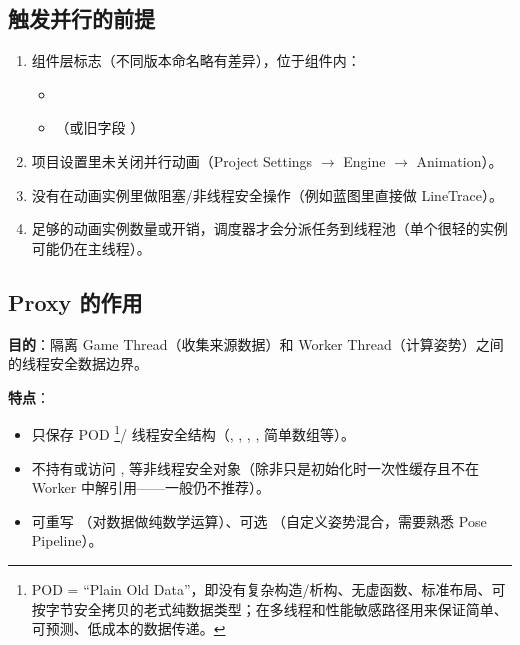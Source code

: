 \documentclass[10pt,openright,oneside,CJKmath]{MyBook}
\begin{document}
\subsection{触发并行的前提}
\begin{enumerate}
  \item 组件层标志（不同版本命名略有差异），位于组件内：
  \begin{itemize}
    \item {}
    \item {}（或旧字段 ）
  \end{itemize}
  \item 项目设置里未关闭并行动画（Project Settings $\rightarrow$ Engine $\rightarrow$ Animation）。
  \item 没有在动画实例里做阻塞/非线程安全操作（例如蓝图里直接做 LineTrace）。
  \item 足够的动画实例数量或开销，调度器才会分派任务到线程池（单个很轻的实例可能仍在主线程）。
\end{enumerate}

\subsection{Proxy 的作用}
\textbf{目的}：隔离 Game Thread（收集来源数据）和 Worker Thread（计算姿势）之间的线程安全数据边界。  

\textbf{特点}：
\begin{itemize}
  \item 只保存 POD \footnote{POD = “Plain Old Data”，即没有复杂构造/析构、无虚函数、标准布局、可按字节安全拷贝的老式纯数据类型；在多线程和性能敏感路径用来保证简单、可预测、低成本的数据传递。}/ 线程安全结构（, , , , 简单数组等）。
  \item 不持有或访问 ,  等非线程安全对象（除非只是初始化时一次性缓存且不在 Worker 中解引用——一般仍不推荐）。
  \item 可重写 （对数据做纯数学运算）、可选 （自定义姿势混合，需要熟悉 Pose Pipeline）。
\end{itemize}
\end{document}
